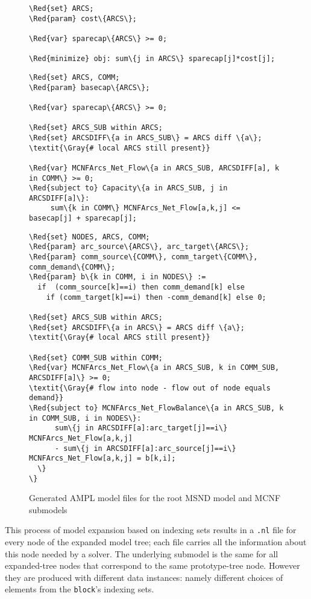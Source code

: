 \documentclass[10pt,a4paper]{report}
\begin{document}
\begin{figure}
{\small
\begin{Verbatim}[frame=single,framerule=0.2pt,framesep=5pt,commandchars=\\\{\}]
%------------------------------- root.mod --------------------------------
\Red{set} ARCS;
\Red{param} cost\{ARCS\};

\Red{var} sparecap\{ARCS\} >= 0;

\Red{minimize} obj: sum\{j in ARCS\} sparecap[j]*cost[j];
\end{Verbatim}
\begin{Verbatim}[frame=single,framerule=0.2pt,framesep=5pt,commandchars=\\\{\}]
% -------------------------- root_MCNFArcs.mod ----------------------------
\Red{set} ARCS, COMM;
\Red{param} basecap\{ARCS\};

\Red{var} sparecap\{ARCS\} >= 0;

\Red{set} ARCS_SUB within ARCS;
\Red{set} ARCSDIFF\{a in ARCS_SUB\} = ARCS diff \{a\};  \textit{\Gray{# local ARCS still present}}

\Red{var} MCNFArcs_Net_Flow\{a in ARCS_SUB, ARCSDIFF[a], k in COMM\} >= 0;
\Red{subject to} Capacity\{a in ARCS_SUB, j in ARCSDIFF[a]\}:
     sum\{k in COMM\} MCNFArcs_Net_Flow[a,k,j] <= basecap[j] + sparecap[j];
\end{Verbatim}
\begin{Verbatim}[frame=single,framerule=0.2pt,framesep=5pt,commandchars=\\\{\}]
% -------------------------- root_MCNFArcs_Net.mod ----------------------------
\Red{set} NODES, ARCS, COMM;
\Red{param} arc_source\{ARCS\}, arc_target\{ARCS\};
\Red{param} comm_source\{COMM\}, comm_target\{COMM\}, comm_demand\{COMM\};
\Red{param} b\{k in COMM, i in NODES\} := 
  if  (comm_source[k]==i) then comm_demand[k] else 
    if (comm_target[k]==i) then -comm_demand[k] else 0;

\Red{set} ARCS_SUB within ARCS;
\Red{set} ARCSDIFF\{a in ARCS\} = ARCS diff \{a\};  \textit{\Gray{# local ARCS still present}}

\Red{set} COMM_SUB within COMM;
\Red{var} MCNFArcs_Net_Flow\{a in ARCS_SUB, k in COMM_SUB, ARCSDIFF[a]\} >= 0;
\textit{\Gray{# flow into node - flow out of node equals demand}} 
\Red{subject to} MCNFArcs_Net_FlowBalance\{a in ARCS_SUB, k in COMM_SUB, i in NODES\}:
      sum\{j in ARCSDIFF[a]:arc_target[j]==i\} MCNFArcs_Net_Flow[a,k,j]  
      - sum\{j in ARCSDIFF[a]:arc_source[j]==i\} MCNFArcs_Net_Flow[a,k,j] = b[k,i];  
  \}
\}
\end{Verbatim}
\caption{Generated AMPL model files for the root MSND model and MCNF submodels}
\label{AMPLsubmodMCNF}
}
\end{figure}
%
This process of model expansion based on indexing sets results
in a {\tt *.nl} file for every node of the expanded model
tree; each file carries all the information about this node needed by a
solver. The underlying submodel is the same for all expanded-tree
nodes that correspond to the same prototype-tree node. However
they are produced with different data instances: namely different
choices of elements from the {\tt block}'s indexing sets.
\end{document}
